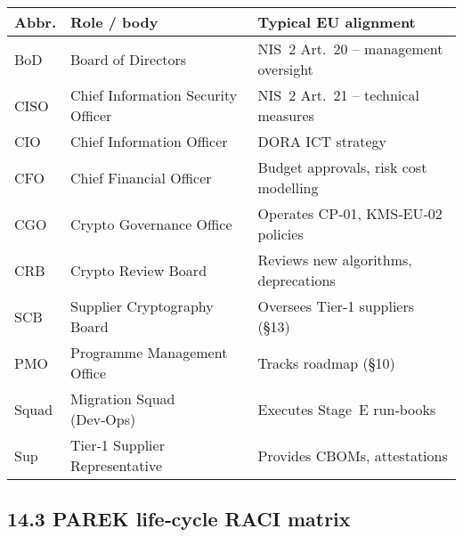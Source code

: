 \documentclass[
  english,
]{article}
\begin{document}
\begin{longtable}[]{@{}
  >{\raggedright\arraybackslash}p{}
  >{\raggedright\arraybackslash}p{}
  >{\raggedright\arraybackslash}p{}@{}}
\toprule\noalign{}
\begin{minipage}[b]{\linewidth}\raggedright
Abbr.
\end{minipage} & \begin{minipage}[b]{\linewidth}\raggedright
Role / body
\end{minipage} & \begin{minipage}[b]{\linewidth}\raggedright
Typical EU alignment
\end{minipage} \\
\midrule\noalign{}
\endhead
\bottomrule\noalign{}
\endlastfoot
BoD & Board of Directors & NIS~2 Art.~20 -- management oversight \\
CISO & Chief Information Security Officer & NIS~2 Art.~21 -- technical
measures \\
CIO & Chief Information Officer & DORA ICT strategy \\
CFO & Chief Financial Officer & Budget approvals, risk cost modelling \\
CGO & Crypto Governance Office & Operates CP‑01, KMS‑EU‑02 policies \\
CRB & Crypto Review Board & Reviews new algorithms, deprecations \\
SCB & Supplier Cryptography Board & Oversees Tier‑1 suppliers (§13) \\
PMO & Programme Management Office & Tracks roadmap (§10) \\
Squad & Migration Squad (Dev‑Ops) & Executes Stage~E run‑books \\
Sup & Tier‑1 Supplier Representative & Provides CBOMs, attestations \\
\end{longtable}

\subsection{14.3 PAREK life‑cycle RACI
matrix}\label{parek-lifecycle-raci-matrix}
\end{document}
